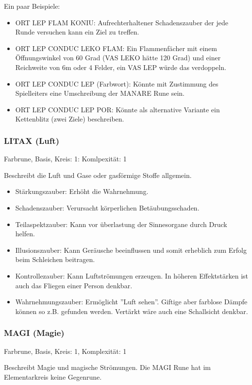 \documentclass{article}
\begin{document}
Ein paar Beispiele:

\begin{itemize}
\item ORT LEP FLAM KONIU: Aufrechterhaltener Schadenszauber der jede Runde versuchen kann ein Ziel zu treffen.
\item ORT LEP CONDUC LEKO FLAM: Ein Flammenfächer mit einem Öffnungswinkel von 60 Grad (VAS LEKO hätte 120 Grad) und einer Reichweite von 6m oder 4 Felder, ein VAS LEP würde das verdoppeln.
\item ORT LEP CONDUC LEP (Farbwort): Könnte mit Zustimmung des Spielleiters eine Umschreibung der MANARE Rune sein.
\item ORT LEP CONDUC LEP POR: Könnte als alternative Variante ein Kettenblitz (zwei Ziele) beschreiben.
\end{itemize}

\subsubsection{LITAX (Luft)}

Farbrune, Basis, Kreis: 1: Komlpexität: 1

Beschreibt die Luft und Gase oder gasförmige Stoffe allgemein.

\begin{itemize}
\item Stärkungszauber: Erhöht die Wahrnehmung.
\item Schadenszauber: Verursacht körperlichen Betäubungsschaden.
\item Teilaspektzauber: Kann vor überlastung der Sinnesorgane durch Druck helfen.
\item Illusionszauber: Kann Geräusche beeinflussen und somit erheblich zum Erfolg beim Schleichen beitragen.
\item Kontrollezauber: Kann Luftströmungen erzeugen. In höheren Effektstärken ist auch das Fliegen einer Person denkbar.
\item Wahrnehmungszauber: Ermöglicht ''Luft sehen''. Giftige aber farblose Dämpfe können so z.B. gefunden werden. Vertärkt wäre auch eine Schallsicht denkbar.
\end{itemize}

\subsubsection{MAGI (Magie)}

Farbrune, Basis, Kreis: 1, Komplexität: 1

Beschreibt Magie und magische Strömungen. Die MAGI Rune hat im Elementarkreis keine Gegenrune.
\end{document}
